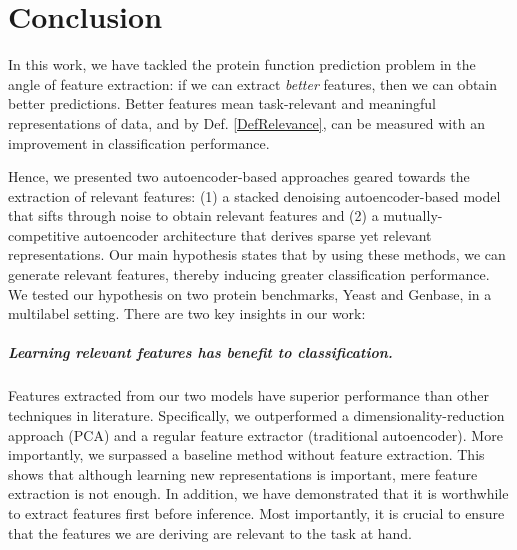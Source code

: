 %
%
%
%
%
\chapter{Conclusion}
\label{ConclusionsChapter}

\par In this work, we have tackled the protein function prediction problem in
the angle of feature extraction: if we can extract \emph{better} features, then
we can obtain better predictions. Better features mean task-relevant and
meaningful representations of data, and by Def. \ref{DefRelevance}, can be
measured with an improvement in classification performance. 

\par Hence, we presented two autoencoder-based approaches geared towards the
extraction of relevant features: (1) a stacked denoising autoencoder-based
model that sifts through noise to obtain relevant features and (2) a
mutually-competitive autoencoder architecture that derives sparse yet relevant
representations. Our main hypothesis states that by using these methods, we can
generate relevant features, thereby inducing greater classification
performance. We tested our hypothesis on two protein benchmarks, Yeast and
Genbase, in a multilabel setting. There are two key insights in our work:


\paragraph{Learning relevant features has benefit to classification.} Features
extracted from our two models have superior performance than other techniques
in literature. Specifically, we outperformed a dimensionality-reduction
approach (PCA) and a regular feature extractor (traditional autoencoder). More
importantly, we surpassed a baseline method without feature extraction. This
shows that although learning new representations is important, mere feature
extraction is not enough. In addition, we have demonstrated that it is
worthwhile to extract features first before inference. Most importantly, it is
crucial to ensure that the features we are deriving are relevant to the task at
hand. 

